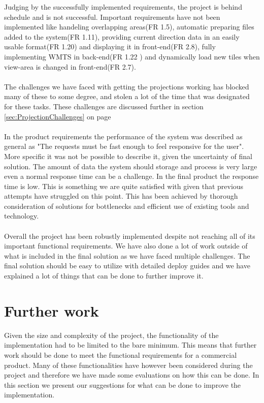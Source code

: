 \documentclass[11pt,a4paper,titlepage,oneside]{report}
\begin{document}
Judging by the successfully implemented requirements, the project is behind schedule and is not successful. Important requirements have not been implemented like handeling overlapping areas(FR 1.5), automatic preparing files added to the system(FR 1.11), providing current direction data in an easily usable format(FR 1.20) and displaying it in \gls{front-end}(FR 2.8), fully implementing \gls{WMTS} in \gls{back-end}(FR 1.22 ) and dynamically load new tiles when view-area is changed in \gls{front-end}(FR 2.7). \\ \\
The challenges we have faced with getting the projections working has blocked many of these to some degree, and stolen a lot of the time that was designated for these tasks. These challenges are discussed further in section \ref{sec:ProjectionChallenges} on page \pageref{sec:ProjectionChallenges} \\ \\
In the product requirements the performance of the system was described as general as "The requests must be fast enough to feel responsive for the user". More specific it was not be possible to describe it, given the uncertainty of final solution. The amount of data the system should storage and process is very large even a normal response time can be a challenge. In the final product the response time is low. This is something we are quite satisfied with given that previous attempts have struggled on this point. This has been achieved by thorough consideration of solutions for bottlenecks and efficient use of existing tools and technology. \\ \\
Overall the project has been robustly implemented despite not reaching all of its important functional requirements. We have also done a lot of work outside of what is included in the final solution as we have faced multiple challenges. The final solution should be easy to utilize with detailed deploy guides and we have explained a lot of things that can be done to further improve it.



\section{Further work}
Given the size and complexity of the project, the functionality of the implementation had to be limited to the bare minimum. This means that further work should be done to meet the functional requirements for a commercial product. Many of these functionalities have however been considered during the project and therefore we have made some evaluations on how this can be done. In this section we present our suggestions for what can be done to improve the implementation.
\end{document}
